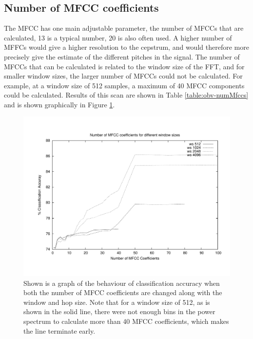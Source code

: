%
%
\subsection{Number of MFCC coefficients}

The MFCC has one main adjustable parameter, the number of MFCCs that
are calculated, 13 is a typical number, 20 is also often used.  A
higher number of MFFCs would give a higher resolution to the cepstrum,
and would therefore more precisely give the estimate of the different
pitches in the signal.  The number of MFCCs that can be calculated is
related to the window size of the FFT, and for smaller window sizes,
the larger number of MFCCs could not be calculated.  For example, at a
window size of 512 samples, a maximum of 40 MFCC components could be
calculated.  Results of this scan are shown in Table
\ref{table:obv-numMfccs} and is shown graphically in Figure
\ref{fig:gnuplot-obv-numMfcc}.

\begin{figure}[t]
\centering
\includegraphics[width=\columnwidth]{figures/gnuplot-obv-numMfcc}
\caption{Shown is a graph of the behaviour of classification accuracy
  when both the number of MFCC coefficients are changed along with the
  window and hop size.  Note that for a window size of 512, as
  is shown in the solid line, there were not enough bins in the power
  spectrum to calculate more than 40 MFCC coefficients, which makes
  the line terminate early.}
\label{fig:gnuplot-obv-numMfcc}
\end{figure}



